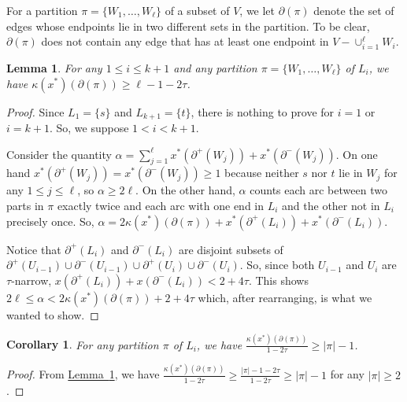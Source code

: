 \documentclass[11pt]{article}
\newcommand{\lref}[2][]{\hyperref[#2]{#1~\ref*{#2}}}
\newtheorem{lemma}[theorem]{Lemma}
\newtheorem{corollary}[theorem]{Corollary}
\theoremstyle{definition}
\newcounter{note}[section]
\begin{document}
For a partition $\pi = \{W_1, \ldots, W_\ell\}$ of a subset of $V$, we let
$\partial(\pi)$ denote the set of edges whose endpoints lie in two different
sets in the partition. To be clear, $\partial(\pi)$ does not contain any edge that has at least one endpoint in $V-\cup_{i=1}^\ell W_i$.

\begin{lemma}\label{lem:parts}
For any $1 \leq i \leq k+1$ and any partition $\pi = \{W_1, \ldots, W_\ell\}$ of $L_i$, we have $\kappa(x^*)(\partial(\pi))\geq \ell-1-2\tau$.
\end{lemma}
\begin{proof}
Since $L_1 = \{s\}$ and $L_{k+1} = \{t\}$, there is nothing to prove for $i = 1$ or $i = k+1$. So, we suppose $1 < i < k+1$.

Consider the quantity $\alpha = \sum_{j=1}^\ell x^*(\partial^+(W_j)) + x^*(\partial^-(W_j))$.
On one hand $x^*(\partial^+(W_j)) = x^*(\partial^-(W_j)) \geq 1$ because neither $s$ nor $t$ lie in $W_j$ for any $1 \leq j \leq \ell$, so
$\alpha \geq 2\ell$. On the other hand, $\alpha$ counts each arc between two parts in $\pi$ exactly twice and each
arc with one end in $L_i$ and the other not in $L_i$ precisely once. So, $\alpha = 2\kappa(x^*)(\partial(\pi)) + x^*(\partial^+(L_i)) + x^*(\partial^-(L_i))$.

Notice that $\partial^+(L_i)$ and $\partial^-(L_i)$ are disjoint subsets of $\partial^+(U_{i-1}) \cup \partial^-(U_{i-1}) \cup \partial^+(U_i) \cup \partial^-(U_i)$.
So, since both $U_{i-1}$ and $U_i$ are $\tau$-narrow, $x(\partial^+(L_i)) + x(\partial^-(L_i)) < 2+4\tau$.
This shows $2\ell \leq \alpha < 2\kappa(x^*)(\partial(\pi)) + 2 + 4\tau$ which, after rearranging, is what we wanted to show.
\end{proof}





\begin{corollary}\label{cor:parts}
  For any partition $\pi$ of $L_i$, we have
  $\frac{\kappa(x^*)(\partial(\pi))}{1-2\tau}\geq |\pi|-1$.
\end{corollary}
\begin{proof}
From \lref[Lemma]{lem:parts}, we have $\frac{\kappa(x^*)(\partial(\pi))}{1-2\tau} \geq \frac{|\pi|-1-2\tau}{1-2\tau} \geq |\pi|-1$ for any $|\pi| \geq 2$.
\end{proof}
\end{document}
